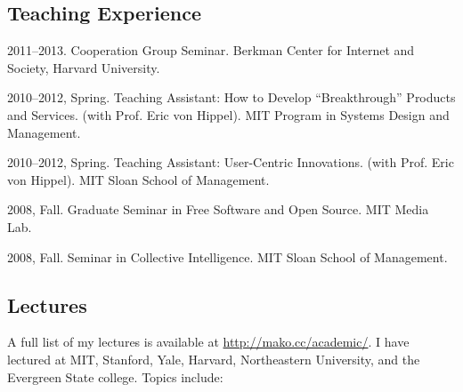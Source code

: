\documentclass[10pt]{article}
\newenvironment{cvlist}{
\begin{list}{}{\leftmargin=3.0em \itemindent=-3.0em}
  \setlength{\itemsep}{0pt}
  \setlength{\parskip}{0em}
  \setlength{\parsep}{1em}
  \setlength{\parindent}{0em}}
{\vspace{1em}
\end{list}}
\begin{document}
\subsection{Teaching Experience}
\begin{cvlist}
\item 2011--2013. Cooperation Group Seminar. Berkman Center
  for Internet and Society, Harvard University.
\item 2010--2012, Spring. Teaching Assistant: How to Develop ``Breakthrough''
  Products and Services. (with Prof. Eric von Hippel). MIT Program in
  Systems Design and Management.
\item 2010--2012, Spring. Teaching Assistant: User-Centric
  Innovations. (with Prof. Eric von Hippel). MIT Sloan School of
  Management.
\item 2008, Fall. Graduate Seminar in Free Software and Open
  Source. MIT Media Lab.
\item 2008, Fall. Seminar in Collective Intelligence. MIT Sloan School
  of Management.
\end{cvlist}

\subsection{Lectures}

A full list of my lectures is available at
\url{http://mako.cc/academic/}. I have lectured at MIT, Stanford,
Yale, Harvard, Northeastern University, and the Evergreen State
college. Topics include:
\end{document}
